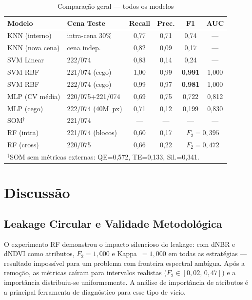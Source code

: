 \documentclass[conference]{IEEEtran}
\begin{document}
\begin{table}[!t]
  \caption{Comparação geral — todos os modelos}
  \label{tab:comparacao}
  \centering
  \setlength{\tabcolsep}{3pt}
  \begin{tabular}{llcccc}
    \toprule
    \textbf{Modelo} & \textbf{Cena Teste} & \textbf{Recall}
                    & \textbf{Prec.} & \textbf{F1} & \textbf{AUC} \\
    \midrule
    KNN (interno)   & intra-cena 30\%    & 0,77 & 0,71 & 0,74 & —     \\
    KNN (nova cena) & cena indep.        & 0,82 & 0,09 & 0,17 & —     \\
    SVM Linear      & 222/074            & 0,83 & 0,14 & 0,24 & —     \\
    SVM RBF         & 221/074 (cego)     & 1,00 & 0,99 & \textbf{0,991} & 1,000 \\
    SVM RBF         & 222/074 (cego)     & 0,99 & 0,97 & \textbf{0,981} & 1,000 \\
    MLP (CV média)  & 220/075+221/074    & 0,69 & 0,75 & 0,722 & 0,812 \\
    MLP (cego)      & 222/074 (40M~px)   & 0,71 & 0,12 & 0,199 & 0,830 \\
    SOM$^\dagger$   & 221/074            & —    & —    & —     & —     \\
    RF (intra)      & 221/074 (blocos)   & 0,60 & 0,17 & \multicolumn{2}{c}{$F_2=0{,}395$} \\
    RF (cross)      & 220/075            & 0,66 & 0,22 & \multicolumn{2}{c}{$F_2=0{,}472$} \\
    \bottomrule
    \multicolumn{6}{l}{$^\dagger$SOM sem métricas externas: QE=0,572,
      TE=0,133, Sil.=0,341.}
  \end{tabular}
\end{table}

\section{Discussão}

\subsection{Leakage Circular e Validade Metodológica}

O experimento RF demonstrou o impacto silencioso do leakage: com dNBR
e dNDVI como atributos, $F_2 = 1{,}000$ e Kappa~$= 1{,}000$ em todas
as estratégias — resultado impossível para um problema com fronteira
espectral ambígua. Após a remoção, as métricas caíram para intervalos
realistas ($F_2 \in [0{,}02,\,0{,}47]$) e a importância distribuiu-se
uniformemente. A análise de importância de atributos é a principal
ferramenta de diagnóstico para esse tipo de vício.
\end{document}
